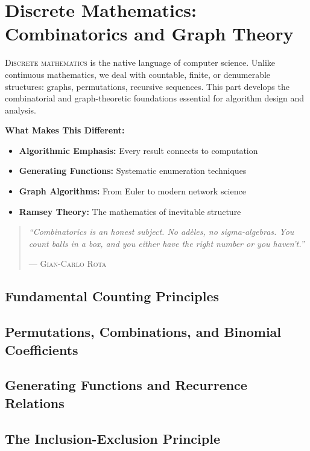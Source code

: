 \part{Discrete Mathematics: Combinatorics and Graph Theory}
\label{part:discrete}

\begin{partintro}
\lettrine[lines=3]{D}{iscrete mathematics} is the native language of computer science. Unlike continuous mathematics, we deal with countable, finite, or denumerable structures: graphs, permutations, recursive sequences. This part develops the combinatorial and graph-theoretic foundations essential for algorithm design and analysis.

\vspace{1em}
\textbf{What Makes This Different:}
\begin{itemize}[noitemsep]
    \item \textbf{Algorithmic Emphasis:} Every result connects to computation
    \item \textbf{Generating Functions:} Systematic enumeration techniques
    \item \textbf{Graph Algorithms:} From Euler to modern network science
    \item \textbf{Ramsey Theory:} The mathematics of inevitable structure
\end{itemize}

\begin{quote}
\textit{``Combinatorics is an honest subject. No adèles, no sigma-algebras. You count balls in a box, and you either have the right number or you haven't.''}

\hfill--- \textsc{Gian-Carlo Rota}
\end{quote}
\end{partintro}

\chapter{Fundamental Counting Principles}
\chapter{Permutations, Combinations, and Binomial Coefficients}
\chapter{Generating Functions and Recurrence Relations}
\chapter{The Inclusion-Exclusion Principle}
